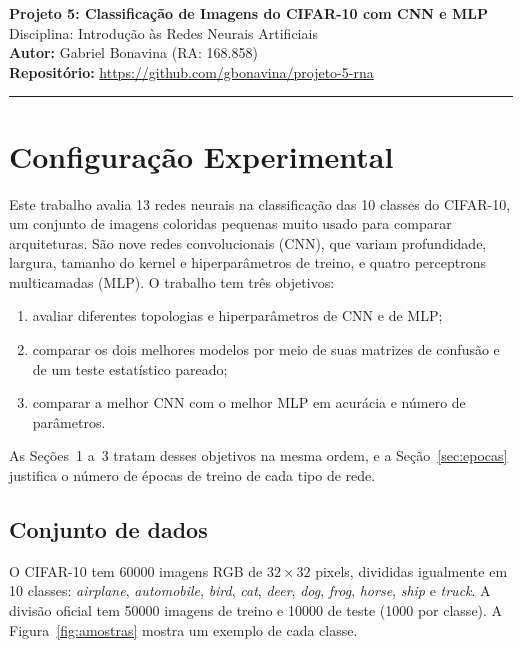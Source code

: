 \documentclass[11pt,a4paper]{article}
\newcommand{\w}[1]{\textit{#1}}
\begin{document}
\begin{center}
    {\LARGE \textbf{Projeto 5: Classificação de Imagens do CIFAR-10 com CNN e MLP}} \\[0.35em]
    {\large Disciplina: Introdução às Redes Neurais Artificiais} \\[0.3em]
    \textbf{Autor:} Gabriel Bonavina (RA: 168.858)\\[0.2em]
    \textbf{Repositório:} \url{https://github.com/gbonavina/projeto-5-rna}
\end{center}
\vspace{-0.5em}
\hrule
\vspace{0.8em}

\section*{Configuração Experimental}

Este trabalho avalia 13 redes neurais na classificação das 10 classes do CIFAR-10, um conjunto de imagens coloridas pequenas muito usado para comparar arquiteturas. São nove redes convolucionais (CNN), que variam profundidade, largura, tamanho do kernel e hiperparâmetros de treino, e quatro perceptrons multicamadas (MLP). O trabalho tem três objetivos:
\begin{enumerate}
    \item avaliar diferentes topologias e hiperparâmetros de CNN e de MLP;
    \item comparar os dois melhores modelos por meio de suas matrizes de confusão e de um teste estatístico pareado;
    \item comparar a melhor CNN com o melhor MLP em acurácia e número de parâmetros.
\end{enumerate}
As Seções~1 a~3 tratam desses objetivos na mesma ordem, e a Seção~\ref{sec:epocas} justifica o número de épocas de treino de cada tipo de rede.

\subsection*{Conjunto de dados}

O CIFAR-10 tem \num{60000} imagens RGB de $32\times32$ pixels, divididas igualmente em 10 classes: \w{airplane}, \w{automobile}, \w{bird}, \w{cat}, \w{deer}, \w{dog}, \w{frog}, \w{horse}, \w{ship} e \w{truck}. A divisão oficial tem \num{50000} imagens de treino e \num{10000} de teste (\num{1000} por classe). A Figura~\ref{fig:amostras} mostra um exemplo de cada classe.
\end{document}
